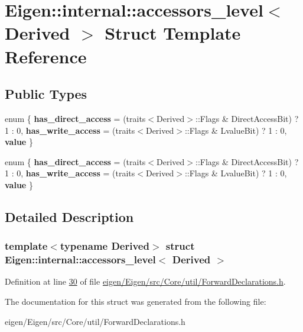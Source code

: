 \hypertarget{struct_eigen_1_1internal_1_1accessors__level}{}\section{Eigen\+:\+:internal\+:\+:accessors\+\_\+level$<$ Derived $>$ Struct Template Reference}
\label{struct_eigen_1_1internal_1_1accessors__level}
\subsection*{Public Types}
\begin{DoxyCompactItemize}
\item 
\mbox{\label{struct_eigen_1_1internal_1_1accessors__level_a53f2562abc4fa69d7112076716fa0d11}} 
enum \{ {\bfseries has\+\_\+direct\+\_\+access} = (traits$<$Derived$>$\+:\+:Flags \& Direct\+Access\+Bit) ? 1 \+: 0, 
{\bfseries has\+\_\+write\+\_\+access} = (traits$<$Derived$>$\+:\+:Flags \& Lvalue\+Bit) ? 1 \+: 0, 
{\bfseries value}
 \}
\item 
\mbox{\label{struct_eigen_1_1internal_1_1accessors__level_a7c1ceecfe35dd1cc1c244c99e53562bc}} 
enum \{ {\bfseries has\+\_\+direct\+\_\+access} = (traits$<$Derived$>$\+:\+:Flags \& Direct\+Access\+Bit) ? 1 \+: 0, 
{\bfseries has\+\_\+write\+\_\+access} = (traits$<$Derived$>$\+:\+:Flags \& Lvalue\+Bit) ? 1 \+: 0, 
{\bfseries value}
 \}
\end{DoxyCompactItemize}


\subsection{Detailed Description}
\subsubsection*{template$<$typename Derived$>$\newline
struct Eigen\+::internal\+::accessors\+\_\+level$<$ Derived $>$}



Definition at line \hyperlink{eigen_2_eigen_2src_2_core_2util_2_forward_declarations_8h_source_l00030}{30} of file \hyperlink{eigen_2_eigen_2src_2_core_2util_2_forward_declarations_8h_source}{eigen/\+Eigen/src/\+Core/util/\+Forward\+Declarations.\+h}.



The documentation for this struct was generated from the following file\+:\begin{DoxyCompactItemize}
\item 
eigen/\+Eigen/src/\+Core/util/\+Forward\+Declarations.\+h\end{DoxyCompactItemize}
